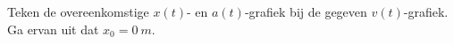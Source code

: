 

\item{}\begin{minipage}[t]{.6\linewidth}
	Teken de overeenkomstige $x(t)$- en $a(t)$-grafiek bij de gegeven $v(t)$-grafiek. Ga ervan uit dat $x_0=\SI{0}{m}$.
\end{minipage}
\hfill
\begin{minipage}[t]{.37\linewidth}
	\raisebox{1ex-\height}{%
		\texttt{[image: v(t)]}%
		} 
\end{minipage}